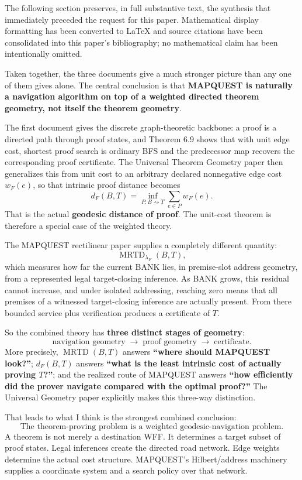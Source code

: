 \documentclass[11pt]{article}
\theoremstyle{definition}
\theoremstyle{remark}
\newcommand{\MRTD}{\operatorname{MRTD}}
\begin{document}
The following section preserves, in full substantive text, the synthesis that immediately preceded the request for this paper. Mathematical display formatting has been converted to LaTeX and source citations have been consolidated into this paper's bibliography; no mathematical claim has been intentionally omitted.

Taken together, the three documents give a much stronger picture than any one of them gives alone. The central conclusion is that \textbf{MAPQUEST is naturally a navigation algorithm on top of a weighted directed theorem geometry, not itself the theorem geometry}.

The first document gives the discrete graph-theoretic backbone: a proof is a directed path through proof states, and Theorem 6.9 shows that with unit edge cost, shortest proof search is ordinary BFS and the predecessor map recovers the corresponding proof certificate. The Universal Theorem Geometry paper then generalizes this from unit cost to an arbitrary declared nonnegative edge cost $w_F(e)$, so that intrinsic proof distance becomes
\[
d_F(B,T)=\inf_{P:B\rightsquigarrow T}\sum_{e\in P}w_F(e).
\]
That is the actual \textbf{geodesic distance of proof}. The unit-cost theorem is therefore a special case of the weighted theory.

The MAPQUEST rectilinear paper supplies a completely different quantity:
\[
\MRTD_{\lambda_F}(B,T),
\]
which measures how far the current BANK lies, in premise-slot address geometry, from a represented legal target-closing inference. As BANK grows, this residual cannot increase, and under isolated addressing, reaching zero means that all premises of a witnessed target-closing inference are actually present. From there bounded service plus verification produces a certificate of $T$.

So the combined theory has \textbf{three distinct stages of geometry}:
\[
\boxed{\text{navigation geometry}\;\longrightarrow\;\text{proof geometry}\;\longrightarrow\;\text{certificate}.}
\]
More precisely, $\MRTD(B,T)$ answers \textbf{``where should MAPQUEST look?''}; $d_F(B,T)$ answers \textbf{``what is the least intrinsic cost of actually proving $T$?''}; and the realized route of MAPQUEST answers \textbf{``how efficiently did the prover navigate compared with the optimal proof?''} The Universal Geometry paper explicitly makes this three-way distinction.

That leads to what I think is the strongest combined conclusion:
\[
\boxed{\text{The theorem-proving problem is a weighted geodesic-navigation problem.}}
\]
A theorem is not merely a destination WFF. It determines a target subset of proof states. Legal inferences create the directed road network. Edge weights determine the actual cost structure. MAPQUEST's Hilbert/address machinery supplies a coordinate system and a search policy over that network.
\end{document}
